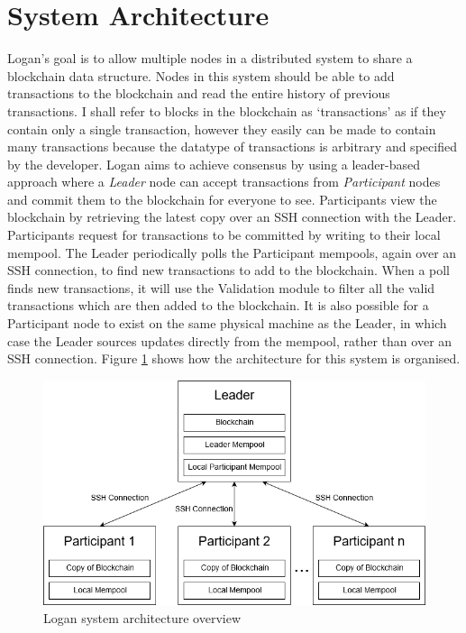 \documentclass[12pt,a4paper,twoside,openright]{report}
\begin{document}
	\section{System Architecture}\label{sec:sysarch}
	Logan's goal is to allow multiple nodes in a distributed system to share a blockchain data structure.
	Nodes in this system should be able to add transactions to the blockchain and read the entire history of previous transactions.
	I shall refer to blocks in the blockchain as `transactions' as if they contain only a single transaction, however they easily can be made to contain many transactions because the datatype of transactions is arbitrary and specified by the developer.
	Logan aims to achieve consensus by using a leader-based approach where a \textit{Leader} node can accept transactions from \textit{Participant} nodes and commit them to the blockchain for everyone to see.
	Participants view the blockchain by retrieving the latest copy over an SSH connection with the Leader.
	Participants request for transactions to be committed by writing to their local mempool. 
	The Leader periodically polls the Participant mempools, again over an SSH connection, to find new transactions to add to the blockchain.
	When a poll finds new transactions, it will use the Validation module to filter all the valid transactions which are then added to the blockchain.
	It is also possible for a Participant node to exist on the same physical machine as the Leader, in which case the Leader sources updates directly from the mempool, rather than over an SSH connection. 
	Figure \ref{fig:sysarch} shows how the architecture for this system is organised.\\	

	\begin{figure}
		\centering
		\includegraphics[width=16cm]{figs/System_Architecture.png}
		\caption{Logan system architecture overview}
		\label{fig:sysarch}
	\end{figure}
\end{document}
